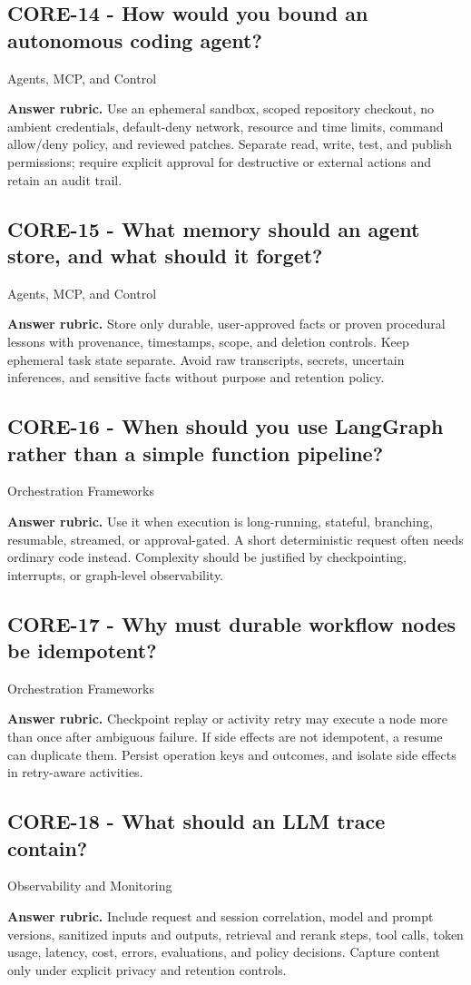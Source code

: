 \subsection*{CORE-14 - How would you bound an autonomous coding agent?}
 \quad Agents, MCP, and Control
\par\smallskip\textbf{Answer rubric.} Use an ephemeral sandbox, scoped repository checkout, no ambient credentials, default-deny network, resource and time limits, command allow/deny policy, and reviewed patches. Separate read, write, test, and publish permissions; require explicit approval for destructive or external actions and retain an audit trail.
\subsection*{CORE-15 - What memory should an agent store, and what should it forget?}
 \quad Agents, MCP, and Control
\par\smallskip\textbf{Answer rubric.} Store only durable, user-approved facts or proven procedural lessons with provenance, timestamps, scope, and deletion controls. Keep ephemeral task state separate. Avoid raw transcripts, secrets, uncertain inferences, and sensitive facts without purpose and retention policy.
\subsection*{CORE-16 - When should you use LangGraph rather than a simple function pipeline?}
 \quad Orchestration Frameworks
\par\smallskip\textbf{Answer rubric.} Use it when execution is long-running, stateful, branching, resumable, streamed, or approval-gated. A short deterministic request often needs ordinary code instead. Complexity should be justified by checkpointing, interrupts, or graph-level observability.
\subsection*{CORE-17 - Why must durable workflow nodes be idempotent?}
 \quad Orchestration Frameworks
\par\smallskip\textbf{Answer rubric.} Checkpoint replay or activity retry may execute a node more than once after ambiguous failure. If side effects are not idempotent, a resume can duplicate them. Persist operation keys and outcomes, and isolate side effects in retry-aware activities.
\subsection*{CORE-18 - What should an LLM trace contain?}
 \quad Observability and Monitoring
\par\smallskip\textbf{Answer rubric.} Include request and session correlation, model and prompt versions, sanitized inputs and outputs, retrieval and rerank steps, tool calls, token usage, latency, cost, errors, evaluations, and policy decisions. Capture content only under explicit privacy and retention controls.
